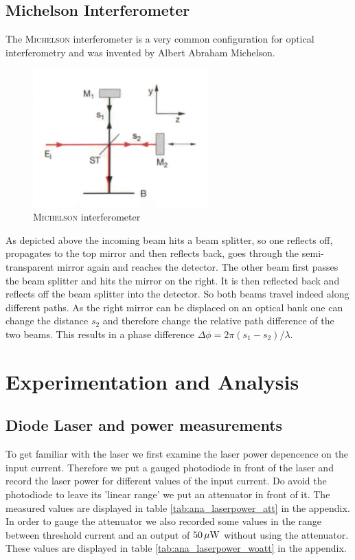 \documentclass{protokoll_en}
\begin{document}
\subsection{Michelson Interferometer}
The \textsc{Michelson} interferometer is a very common configuration for optical interferometry and was invented by Albert Abraham Michelson. 
\begin{figure}[H]
	\centering
		\includegraphics[width=0.6\textwidth]{graphics/michelson}
	\caption{\textsc{Michelson} interferometer~\cite{demtroed2}}
	\label{fig:michelson}
\end{figure}
As depicted above the incoming beam hits a beam splitter, so one reflects off, propagates to the top mirror and then reflects back, goes through the semi-transparent mirror again and reaches the detector. The other beam first passes the beam splitter and hits the mirror on the right. It is then reflected back and reflects off the beam splitter into the detector. So both beams travel indeed along different paths. As the right mirror can be displaced on an optical bank one can change the distance $s_2$ and therefore change the relative path difference of the two beams. This results in a phase difference $\Delta \phi = 2\pi (s_1-s_2)/\lambda$.


\section{Experimentation and Analysis}
\subsection{Diode Laser and power measurements}\label{ana_laserpower}
To get familiar with the laser we first examine the laser power depencence on the input current. Therefore we put a gauged photodiode in front of the laser and record the laser power for different values of the input current. Do avoid the photodiode to leave its 'linear range' we put an attenuator in front of it. The measured values are displayed in table \ref{tab:ana_laserpower_att} in the appendix. In order to gauge the attenuator we also recorded some values in the range between threshold current and an output of $\unit[50]{\mu W}$ without using the attenuator. These values are displayed in table \ref{tab:ana_laserpower_woatt} in the appendix.
\end{document}
